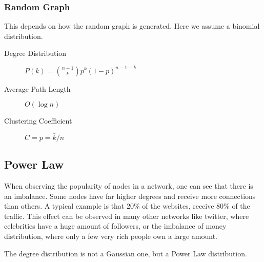 	\subsubsection{Random Graph} %
	\label{ssub:random_graph}
	This depends on how the random graph is generated.
	Here we assume a binomial distribution.
		\begin{description}
			\item[Degree Distribution] $P(k) = \binom{n-1}{k}p^k(1-p)^{n-1-k}$
			\item[Average Path Length] $O(\log n)$
			\item[Clustering Coefficient] $C = p = \bar{k}/n$
		\end{description}

\subsection{Power Law} %
\label{sub:power_law}
When observing the popularity of nodes in a network,
one can see that there is an imbalance.
Some nodes have far higher degrees and receive more connections than others.
A typical example is that 20\% of the websites,
receive 80\% of the traffic.
This effect can be observed in many other networks like twitter,
where celebrities have a huge amount of followers,
or the imbalance of money distribution,
where only a few very rich people own a large amount.

The degree distribution is not a Gaussian one,
but a Power Law distribution.

